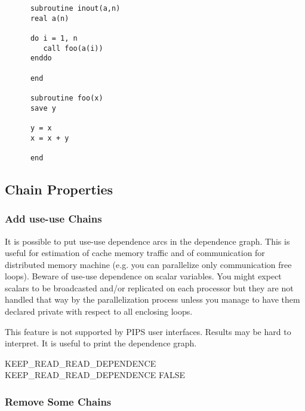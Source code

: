 \documentclass[a4paper]{report}
\begin{document}
\noindent
\verb!      subroutine inout(a,n)!\\
\verb!      real a(n)!\\
\verb!      !\\
\verb!      do i = 1, n!\\
\verb!         call foo(a(i))!\\
\verb!      enddo!\\
\verb!      !\\
\verb!      end!\\
\verb!      !\\
\verb!      subroutine foo(x)!\\
\verb!      save y!\\
\verb!      !\\
\verb!      y = x!\\
\verb!      x = x + y!\\
\verb!      !\\
\verb!      end!\\


\subsection{Chain Properties}

\subsubsection{Add use-use Chains}

It is possible to put use-use dependence arcs in the dependence graph.
This is useful for estimation of cache memory traffic and of
communication for distributed memory machine (e.g. you can parallelize
only communication free loops). Beware of use-use dependence on scalar
variables. You might expect scalars to be broadcasted and/or replicated
on each processor but they are not handled that way by the
parallelization process unless you manage to have them
declared private with respect to all enclosing loops.

This feature is not supported by PIPS user interfaces. Results may be
hard to interpret. It is useful to print the dependence graph.

\begin{PipsProp}{KEEP_READ_READ_DEPENDENCE}
KEEP_READ_READ_DEPENDENCE FALSE
\end{PipsProp}

\subsubsection{Remove Some Chains}
\end{document}
